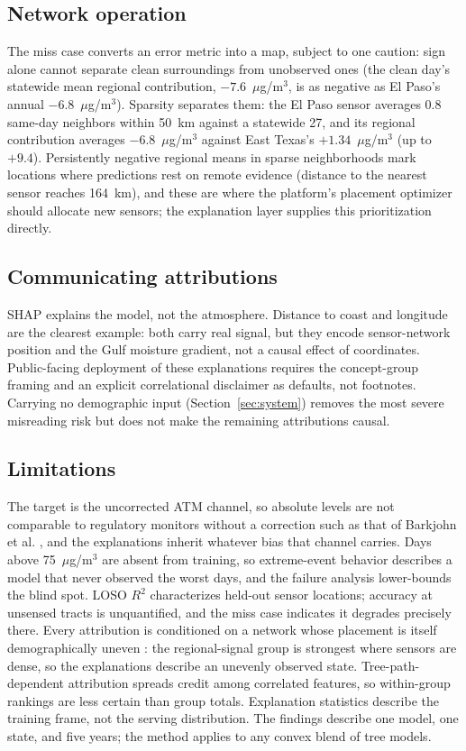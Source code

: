 \documentclass[conference]{IEEEtran}
\newcommand{\ugm}{$\mu$g/m$^3$}
\begin{document}
\subsection{Network operation} The miss case converts an error metric
into a map, subject to one caution: sign alone cannot separate clean
surroundings from unobserved ones (the clean day's statewide mean
regional contribution, $-7.6$~\ugm{}, is as negative as El Paso's annual
$-6.8$~\ugm{}). Sparsity separates them: the El Paso sensor averages 0.8
same-day neighbors within 50~km against a statewide 27, and its regional
contribution averages $-6.8$~\ugm{} against East Texas's $+1.34$~\ugm{}
(up to $+9.4$). Persistently negative regional means in sparse
neighborhoods mark locations where predictions rest on remote evidence
(distance to the nearest sensor reaches 164~km), and these are where the
platform's placement optimizer should allocate new sensors; the
explanation layer supplies this prioritization directly.

\subsection{Communicating attributions} SHAP explains the model, not the
atmosphere. Distance to coast and longitude are the clearest example:
both carry real signal, but they encode sensor-network position and the
Gulf moisture gradient, not a causal effect of coordinates. Public-facing deployment of these
explanations requires the concept-group framing and an explicit
correlational disclaimer as defaults, not footnotes. Carrying no
demographic input (Section~\ref{sec:system}) removes the most severe
misreading risk but does not make the remaining attributions causal.

\subsection{Limitations} The target is the uncorrected ATM channel, so
absolute levels are not comparable to regulatory monitors without a
correction such as that of Barkjohn et al. \cite{barkjohn2021}, and the
explanations inherit whatever bias that channel carries. Days above
75~\ugm{} are absent from training, so extreme-event behavior describes a
model that never observed the worst days, and the failure analysis
lower-bounds the blind spot. LOSO $R^2$ characterizes held-out sensor
locations; accuracy at unsensed tracts is unquantified, and the miss case
indicates it degrades precisely there. Every attribution is conditioned
on a network whose placement is itself demographically uneven
\cite{desouza2021}: the regional-signal group is strongest where sensors
are dense, so the explanations describe an unevenly observed state. Tree-path-dependent attribution
spreads credit among correlated features, so within-group rankings are
less certain than group totals. Explanation statistics describe the
training frame, not the serving distribution. The findings describe one
model, one state, and five years; the method applies to any convex blend
of tree models.
\end{document}
